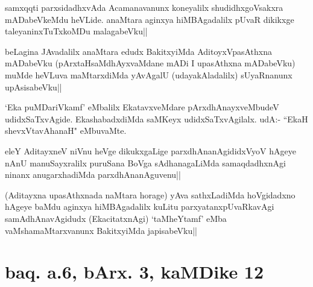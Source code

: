 
\begin{artha}
samxqqti parxsidadhxvAda Acamanavanunx koneyalilx shudidhxgoVsakxra 
mADabeVkeMdu heVLide. anaMtara aginxya hiMBAgadalilx pUvaR dikikxge 
taleyaninxTuTxkoMDu malagabeVku||
\end{artha}


\begin{artha}
beLagina JAvadalilx anaMtara edudx BakitxyiMda AditoyxVpasAthxna 
mADabeVku (pArxtaHsaMdhAyxvaMdane mADi I upasAthxna mADabeVku) muMde 
heVLuva maMtarxdiMda yAvAgalU (udayakAladalilx) sUyaRnanunx 
upAsisabeVku||
\end{artha}


\begin{artha}
`Eka puMDariVkamf' eMbalilx EkatavxveMdare pArxdhAnayxveMbudeV 
udidxSaTxvAgide. EkashabadxdiMda saMKeyx udidxSaTxvAgilalx. udA:- 
``EkaH shevxVtavAhanaH" eMbuvaMte.
\end{artha}


\begin{artha}
eleY AditayxneV niVnu heVge dikukxgaLige parxdhAnanAgididxVyoV hAgeye 
nAnU manuSayxralilx puruSana BoVga sAdhanagaLiMda samaqdadhxnAgi 
ninanx anugarxhadiMda parxdhAnanAguvenu||
\end{artha}

\begin{artha}
(Aditayxna upasAthxnada naMtara horage) yAva sathxLadiMda hoVgidadxno 
hAgeye baMdu aginxya hiMBAgadalilx kuLitu parxyatanxpUvaRkavAgi 
samAdhAnavAgidudx (EkacitatxnAgi) `taMheYtamf' eMba 
vaMshamaMtarxvanunx BakitxyiMda japisabeVku||
\end{artha}

\section*{baq. a.6, bArx. 3, kaMDike 12}

\stext

\stext

\stext

\stext

\stext

\stext


